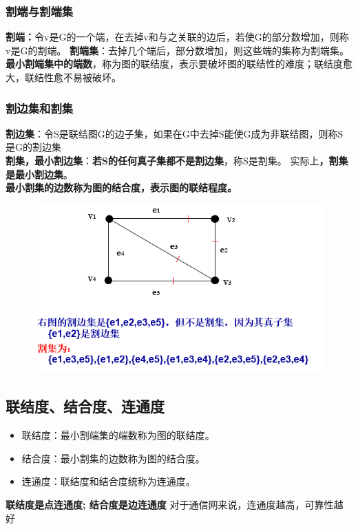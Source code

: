 \subsubsection{割端与割端集}
\textbf{割端：}令v是G的一个端，在去掉v和与之关联的边后，若使G的部分数增加，则称v是G的割端。
\textbf{割端集}：去掉几个端后，部分数增加，则这些端的集称为割端集。\\
\textbf{最小割端集中的端数}，称为图的联结度，表示要破坏图的联结性的难度；联结度愈大，联结性愈不易被破坏。
\subsubsection{割边集和割集}
\textbf{割边集}：令S是联结图G的边子集，如果在G中去掉S能使G成为非联结图，则称S是G的割边集\\
\textbf{割集，最小割边集}：\textbf{若S的任何真子集都不是割边集}，称S是割集。
实际上\textbf{，割集是最小割边集}。\\
\textbf{最小割集的边数称为图的结合度，表示图的联结程度。}
\begin{figure}[H]
	\centering
	\includegraphics[width=0.7\linewidth]{figures/screenshot054}
	\caption{}
	\label{fig:screenshot054}
\end{figure}

\subsection{联结度、结合度、连通度}
\begin{itemize}
	\item 联结度：最小割端集的端数称为图的联结度。
	\item 结合度：最小割集的边数称为图的结合度。
	\item 连通度：联结度和结合度统称为连通度。
\end{itemize}
\textbf{联结度是点连通度;
结合度是边连通度}
对于通信网来说，连通度越高，可靠性越好

